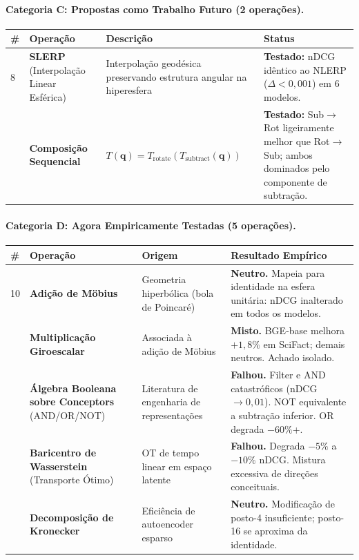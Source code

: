 \documentclass{article}
\begin{document}
\paragraph{Categoria C: Propostas como Trabalho Futuro (2 operações).}

\begin{longtable}{>{\raggedright}p{0.3cm} >{\raggedright}p{2.8cm} >{\raggedright}p{5.5cm} p{4.5cm}}
\toprule
\# & Operação & Descrição & Status \\
\midrule
\endhead
8 & \textbf{SLERP} (Interpolação Linear Esférica) & Interpolação geodésica preservando estrutura angular na hiperesfera & \textbf{Testado:} nDCG idêntico ao NLERP ($\Delta < 0{,}001$) em 6 modelos. \\
\addlinespace
9 & \textbf{Composição Sequencial} & $T(\mathbf{q}) = T_{\text{rotate}}(T_{\text{subtract}}(\mathbf{q}))$ & \textbf{Testado:} Sub$\to$Rot ligeiramente melhor que Rot$\to$Sub; ambos dominados pelo componente de subtração. \\
\bottomrule
\end{longtable}

\paragraph{Categoria D: Agora Empiricamente Testadas (5 operações).}

\begin{longtable}{>{\raggedright}p{0.3cm} >{\raggedright}p{2.8cm} >{\raggedright}p{3.5cm} p{6.5cm}}
\toprule
\# & Operação & Origem & Resultado Empírico \\
\midrule
\endhead
10 & \textbf{Adição de M\"{o}bius} & Geometria hiperbólica (bola de Poincar\'{e}) & \textbf{Neutro.} Mapeia para identidade na esfera unitária: nDCG inalterado em todos os modelos. \\
\addlinespace
11 & \textbf{Multiplicação Giroescalar} & Associada à adição de M\"{o}bius & \textbf{Misto.} BGE-base melhora $+1{,}8\%$ em SciFact; demais neutros. Achado isolado. \\
\addlinespace
12 & \textbf{Álgebra Booleana sobre Conceptors} (AND/OR/NOT) & Literatura de engenharia de representações & \textbf{Falhou.} Filter e AND catastróficos (nDCG $\to 0{,}01$). NOT equivalente a subtração inferior. OR degrada $-60\%$+. \\
\addlinespace
13 & \textbf{Baricentro de Wasserstein} (Transporte Ótimo) & OT de tempo linear em espaço latente & \textbf{Falhou.} Degrada $-5\%$ a $-10\%$ nDCG. Mistura excessiva de direções conceituais. \\
\addlinespace
14 & \textbf{Decomposição de Kronecker} & Eficiência de autoencoder esparso & \textbf{Neutro.} Modificação de posto-4 insuficiente; posto-16 se aproxima da identidade. \\
\bottomrule
\end{longtable}
\end{document}
